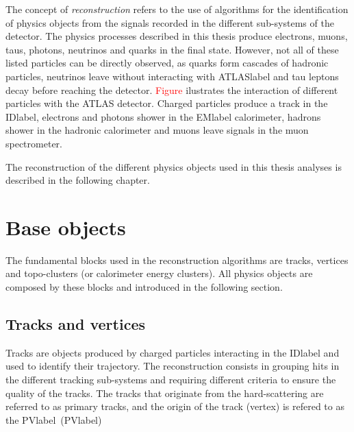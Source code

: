 The concept of \textit{reconstruction} refers to the use of algorithms for the identification of physics objects from the signals recorded in the different sub-systems of the detector. The physics processes described in this thesis produce electrons, muons, taus, photons, neutrinos and quarks in the final state. However, not all of these listed particles can be directly observed, as quarks form cascades of hadronic particles, neutrinos leave without interacting with \acrshort{ATLASlabel} and tau leptons decay before reaching the detector. \textcolor{red}{Figure} ilustrates the interaction of different particles with the \acrshort{ATLAS} detector. Charged particles produce a track in the \acrshort{IDlabel}, electrons and photons shower in the \acrshort{EMlabel} calorimeter, hadrons shower in the hadronic calorimeter and muons leave signals in the muon spectrometer.

The reconstruction of the different physics objects used in this thesis analyses is described in the following chapter.

\section{Base objects}

The fundamental blocks used in the reconstruction algorithms are tracks, vertices and topo-clusters (or calorimeter energy clusters). All physics objects are composed by these blocks and introduced in the following section.

\subsection{Tracks and vertices}

Tracks are objects produced by charged particles interacting in the \acrshort{IDlabel} and used to identify their trajectory. The reconstruction consists in grouping hits in the different tracking sub-systems and requiring different criteria to ensure the quality of the tracks. The tracks that originate from the hard-scattering are referred to as primary tracks, and the origin of the track (vertex) is refered to as the  \acrfull{PVlabel}~(\acrshort{PVlabel})

